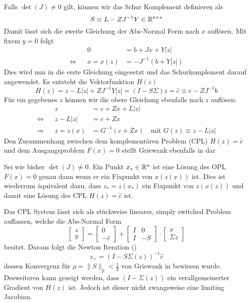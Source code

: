 Falls $\det(J) \neq 0$ gilt, können wir das Schur Komplement definieren als 
 \[
  S \equiv L -ZJ^{-1}Y \in \mathbb{R}^{s\times s}
 \]
Damit lässt sich die zweite Gleichung der Abs-Normal Form nach $x$ auflösen. Mit fixem $y=0$ folgt
\[
 \begin{aligned}
		 && 0 &=  b+Jx + Y|z|   \\
 \iff && x = x(z) &=-J^{-1}(b+Y|z|)
 \end{aligned}
\]
Dies wird nun in die erste Gleichung eingesetzt und das Schurkomplement darauf angewendet. Es entsteht die Vektorfunktion $H(z)$
\[
 H(z) = z - L|z| + ZJ^{-1}Y|z| = (I-S\Sigma)z = \hat c \equiv c-ZJ^{-1}b
 \]
Für ein gegebenes $z$ können wir die obere Gleichung ebenfalls nach $z$ auflösen:
\[
\begin{aligned}
		 && z &= c+Zx + L|z|\\
 \iff && z- L |z| &= c+Zx \\
 \Rightarrow && z = z(x) &= G^{-1}(c+Zx)\quad \text{mit }G(z)\equiv z-L|z|
\end{aligned} 
\]
Den Zusammenhang zwischen dem komplementären Problem (CPL) $H(z) = \hat c$ und dem Ausgangsproblem $F(x) = 0$ stellt Griewank ebenfalls in \cite[Lemma 6.5.]{plan} dar

\begin{theorem}
 Sei wie bisher $\det(J)\neq 0$. Ein Punkt $x_*\in \mathbb{R}^n$ ist eine Lösung des OPL $F(x)=0$ genau dann wenn er ein Fixpunkt von $x(z(x))$ ist. Dies ist wiederrum äquivalent dazu, dass $z_*=z(x_*)$ ein Fixpunkt von $z(x(z))$ und damit eine Lösung des CPL $H(z)=\hat c$ ist.
\end{theorem}

Das CPL System lässt sich als stückweise lineares, simply switched Problem auffassen, welche die Abs-Normal Form
\[
 \begin{bmatrix}
  z\\
  y
 \end{bmatrix}
=
 \begin{bmatrix}
  0\\
  -\hat c
 \end{bmatrix}
+
 \begin{bmatrix}
  I & 0\\
  I & -S
 \end{bmatrix}
\cdot
 \begin{bmatrix}
  x\\
  \Sigma z
 \end{bmatrix}
\]
besitzt. Daraus folgt die Newton Iteration (\cite[S.20]{plan})
\begin{equation}
\label{eq:unfoldedNewton}
 z_+ = (I-S\Sigma(z))^{-1}\hat c
\end{equation}
dessen Konvergenz für $\rho = \|S\|_p <\frac{1}{3}$ von Griewank in \cite[Prop. 7.3]{plan} bewiesen wurde. 
Desweiteren kann gezeigt werden, dass $(I-\Sigma(z))$ ein verallgemeinerter Gradient von $H(z)$ ist. Jedoch ist dieser nicht zwangsweise eine limiting Jacobian.
 
